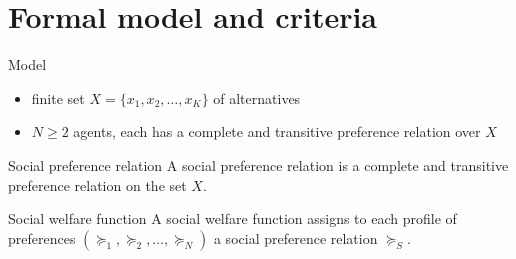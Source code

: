 \documentclass[bigger]{beamer}
\begin{document}
\section{Formal model and criteria}
\label{sec:org9f17f2d}

\begin{frame}[label={sec:org12b0677}]{Model}
\begin{itemize}
\item finite set \(X=\{x_1,x_2,\dots,x_K\}\) of alternatives
\item \(N\geq 2\) agents, each has a complete and transitive preference relation over \(X\)
\end{itemize}
\begin{block}{Social preference relation}
A social preference relation is a complete and transitive preference relation on the set \(X\).
\end{block}
\begin{block}{Social welfare function}
A social welfare function assigns to each profile of preferences \((\succeq_1,\succeq_2,\dots,\succeq_N)\) a social preference relation \(\succeq_S\).
\end{block}
\end{frame}
\end{document}
